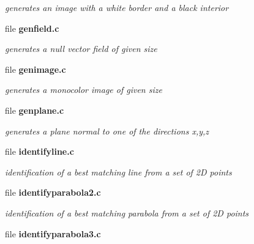 \begin{DoxyCompactItemize}
\begin{DoxyCompactList}\small\item\em generates an image with a white border and a black interior \item\end{DoxyCompactList}

\item 
file {\bf genfield.c}


\begin{DoxyCompactList}\small\item\em generates a null vector field of given size \item\end{DoxyCompactList}

\item 
file {\bf genimage.c}


\begin{DoxyCompactList}\small\item\em generates a monocolor image of given size \item\end{DoxyCompactList}

\item 
file {\bf genplane.c}


\begin{DoxyCompactList}\small\item\em generates a plane normal to one of the directions x,y,z \item\end{DoxyCompactList}

\item 
file {\bf identifyline.c}


\begin{DoxyCompactList}\small\item\em identification of a best matching line from a set of 2D points \item\end{DoxyCompactList}

\item 
file {\bf identifyparabola2.c}


\begin{DoxyCompactList}\small\item\em identification of a best matching parabola from a set of 2D points \item\end{DoxyCompactList}

\item 
file {\bf identifyparabola3.c}



\end{DoxyCompactItemize}
